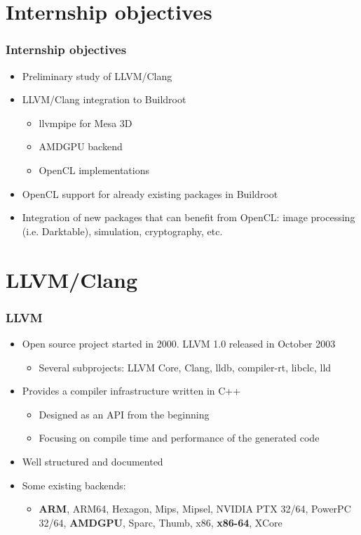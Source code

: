 \documentclass{smilebeamer}
\begin{document}
\section{Internship objectives}

\begin{frame}
\frametitle{Internship objectives}
\begin{itemize}
  \item Preliminary study of LLVM/Clang
  \item LLVM/Clang integration to Buildroot
  \begin{itemize}
    \item llvmpipe for Mesa 3D
    \item AMDGPU backend
    \item OpenCL implementations
  \end{itemize}
  \item OpenCL support for already existing packages in Buildroot
  \item Integration of new packages that can benefit from OpenCL:
  image processing (i.e. Darktable), simulation, cryptography, etc.
\end{itemize}
\end{frame}
\section{LLVM/Clang}

\begin{frame}
\frametitle{LLVM}
\begin{itemize}
  \item Open source project started in 2000. LLVM 1.0 released in October 2003
  \begin{itemize}
    \item Several subprojects: LLVM Core, Clang, lldb, compiler-rt, libclc, lld
  \end{itemize}
  \item Provides a compiler infrastructure written in C++
  \begin{itemize}
    \item Designed as an API from the beginning
    \item Focusing on compile time and performance of the generated code
  \end{itemize}
  \item Well structured and documented
  \item Some existing backends:
  \begin{itemize}
    \item \textbf{ARM}, ARM64, Hexagon, Mips, Mipsel, NVIDIA PTX 32/64,
    PowerPC 32/64, \textbf{AMDGPU}, Sparc, Thumb, x86, \textbf{x86-64}, XCore
  \end{itemize}
\end{itemize}
\end{frame}
\end{document}
